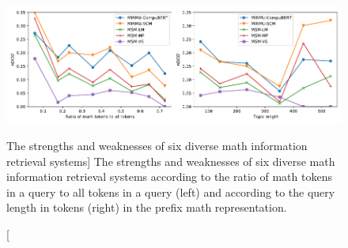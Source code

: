 \begin{figure}
\includegraphics{strengths-and-weaknesses}
\vspace{-0.5cm}
\caption
  [The strengths and weaknesses of six diverse math information retrieval systems]%
  {The strengths and weaknesses of six diverse math information retrieval systems
   according to the ratio of math tokens in a query to all tokens in a query (left)
   and according to the query length in tokens (right) in the prefix math
   representation.  \cite[Figure 8]{novotny2021ensembling}}
\label{fig:strengths-and-weaknesses}
\end{figure}